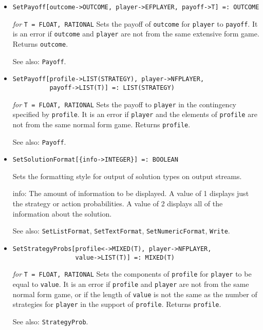 \begin{itemize}
\item
\protect \large \begin{verbatim}
SetPayoff[outcome->OUTCOME, player->EFPLAYER, payoff->T] =: OUTCOME
\end{verbatim}\normalsize

{\it for} {\tt T = FLOAT, RATIONAL}
\bd
Sets the payoff of \verb+outcome+ for \verb+player+ to \verb+payoff+.
It is an error if \verb+outcome+ and \verb+player+ are not from the
same extensive form game.  Returns \verb+outcome+.
\item [See also:] \verb+Payoff+.
\ed

\item
\protect \large \begin{verbatim}
SetPayoff[profile->LIST(STRATEGY), player->NFPLAYER,
          payoff->LIST(T)] =: LIST(STRATEGY)
\end{verbatim}\normalsize

{\it for} {\tt T = FLOAT, RATIONAL}
\bd
Sets the payoff to \verb+player+ in the contingency specified by
\verb+profile+.  It is an error if \verb+player+ and the elements
of \verb+profile+ are not from the same normal form game.
Returns \verb+profile+.
\item [See also:] \verb+Payoff+.
\ed

\item
\protect \large \begin{verbatim}
SetSolutionFormat[{info->INTEGER}] =: BOOLEAN
\end{verbatim}\normalsize

\bd
Sets the formatting style for output of solution types on output streams.
\bd
\item [info:] The amount of information to be displayed.  A value of 1
displays just the strategy or action probabilities.  A value of 2
displays all of the information about the solution. 
\ed
\item [See also:] \verb+SetListFormat+, \verb+SetTextFormat+, 
\verb+SetNumericFormat+, \verb+Write+.
\ed

\item 
\protect \large \begin{verbatim}
SetStrategyProbs[profile<->MIXED(T), player->NFPLAYER,
                 value->LIST(T)] =: MIXED(T)
\end{verbatim} \normalsize

{\it for} {\tt T = FLOAT, RATIONAL}
\bd
Sets the components of \verb+profile+ for \verb+player+ to be equal
to \verb+value+.  It is an error if \verb+profile+ and \verb+player+
are not from the same normal form game, or if the length of \verb+value+
is not the same as the number of strategies for \verb+player+ in the
support of \verb+profile+.  Returns \verb+profile+.
\item [See also:] \verb+StrategyProb+.
\ed


\end{itemize}
